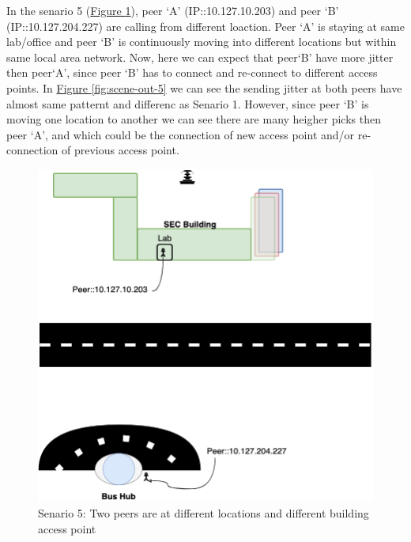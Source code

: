 	In the senario 5 (\hyperref[fig:scene-5]{Figure \ref{fig:scene-5}}), peer `A' (IP::10.127.10.203) and peer `B' (IP::10.127.204.227) are calling from different loaction. Peer `A' is staying at same lab/office and peer `B' is continuously moving into different locations but within same local area network. Now, here we can expect that peer`B' have more jitter then peer`A', since peer `B' has to connect and re-connect to different access points. In \hyperref[fig:scene-out-5]{Figure \ref{fig:scene-out-5}} we can see the sending jitter at both peers have almost same patternt and differenc as Senario 1. However, since peer `B' is moving one location to another we can see there are many heigher picks then peer `A', and which could be the connection of new access point and/or re-connection of previous access point.
	\begin{figure}[tbh]
		\begin{minipage}{\textwidth}
			\includegraphics[scale=0.29]{Images/experiment/senarios/bus_hub.drawio.png}
		\end{minipage}
		\caption{Senario 5: Two peers are at different locations and different building access point}
		\label{fig:scene-5}
	\end{figure}

